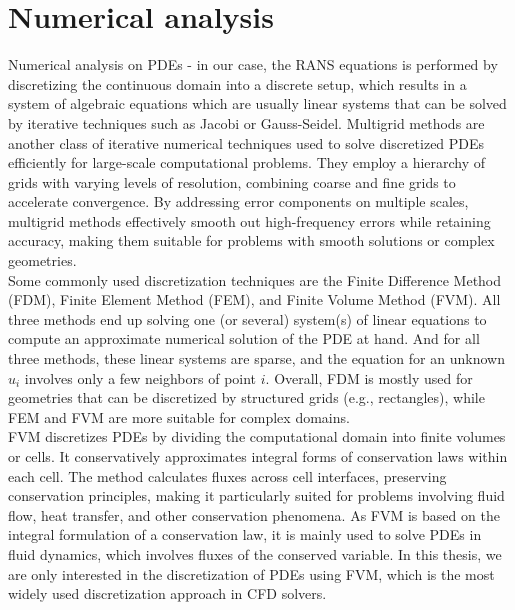 \section{Numerical analysis}
Numerical analysis on PDEs - in our case, the RANS equations is performed by discretizing the continuous domain into a discrete setup, which results in a system of algebraic equations which are usually linear systems that can be solved by iterative techniques such as Jacobi or Gauss-Seidel. Multigrid methods are another class of iterative numerical techniques used to solve discretized PDEs efficiently for large-scale computational problems. They employ a hierarchy of grids with varying levels of resolution, combining coarse and fine grids to accelerate convergence. By addressing error components on multiple scales, multigrid methods effectively smooth out high-frequency errors while retaining accuracy, making them suitable for problems with smooth solutions or complex geometries. \\
Some commonly used discretization techniques are the Finite Difference Method (FDM), Finite Element Method (FEM), and Finite Volume Method (FVM). All three methods end up solving one (or several) system(s) of linear equations to compute an approximate numerical solution of the PDE at hand. And for all three methods, these linear systems are sparse, and the equation for an unknown $u_i$ involves only a few neighbors of point $i$. Overall, FDM is mostly used for geometries that can be discretized by structured grids (e.g., rectangles), while FEM and FVM are more suitable for complex domains. \\
FVM discretizes PDEs by dividing the computational domain into finite volumes or cells. It conservatively approximates integral forms of conservation laws within each cell. The method calculates fluxes across cell interfaces, preserving conservation principles, making it particularly suited for problems involving fluid flow, heat transfer, and other conservation phenomena. As FVM is based on the integral formulation of a conservation law, it is mainly used to solve PDEs in fluid dynamics, which involves fluxes of the conserved variable. In this thesis, we are only interested in the discretization of PDEs using FVM, which is the most widely used discretization approach in CFD solvers. 
